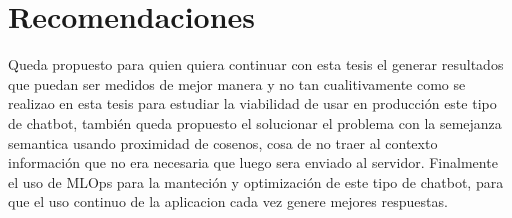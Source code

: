 \chapter{Recomendaciones}

\par Queda propuesto para quien quiera continuar con esta tesis el generar resultados
que puedan ser medidos de mejor manera y no tan cualitivamente como se realizao en esta tesis para
estudiar la viabilidad de 
usar en producción este tipo de chatbot, también queda propuesto el solucionar el problema 
con la semejanza semantica usando proximidad de cosenos, cosa de no traer al contexto información que no 
era necesaria que luego sera enviado al servidor. Finalmente el uso de MLOps para la manteción y optimización de este tipo de chatbot, para 
que el uso continuo de la aplicacion cada vez genere mejores respuestas.